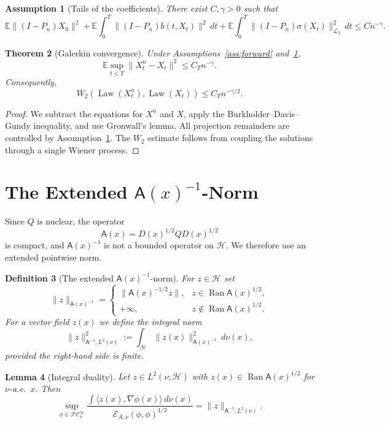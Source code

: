 \documentclass{article}
\newtheorem{theorem}{Theorem}[section]
\newtheorem{lemma}[theorem]{Lemma}
\newtheorem{assumption}[theorem]{Assumption}
\newtheorem{definition}[theorem]{Definition}
\newcommand{\Hh}{\mathcal H}
\newcommand{\LLtwo}{\mathcal L_2}
\newcommand{\E}{\mathbb E}
\newcommand{\Law}{\operatorname{Law}}
\newcommand{\Asf}{\mathsf A}
\newcommand{\Ran}{\operatorname{Ran}}
\newcommand{\FC}{\mathcal{FC}_b^\infty}
\begin{document}
\begin{assumption}[Tails of the coefficients]
\label{ass:tails}
There exist \(C,\gamma>0\) such that
\[
        \E\|(I-P_n)X_0\|^2+
        \E\int_0^T\|(I-P_n)b(t,X_t)\|^2\,dt+
        \E\int_0^T\|(I-P_n)\sigma(X_t)\|_{\LLtwo}^2\,dt
        \le Cn^{-\gamma}.
\]
\end{assumption}

\begin{theorem}[Galerkin convergence]
\label{thm:galerkin}
Under Assumptions~\ref{ass:forward} and~\ref{ass:tails},
\[
        \E\sup_{t\le T}\|X_t^n-X_t\|^2\le C_T n^{-\gamma}.
\]
Consequently,
\[
        W_2(\Law(X_t^n),\Law(X_t))\le C_T n^{-\gamma/2}.
\]
\end{theorem}

\begin{proof}
We subtract the equations for \(X^n\) and \(X\), apply the
Burkholder--Davis--Gundy inequality, and use Gronwall's lemma. All projection
remainders are controlled by Assumption~\ref{ass:tails}. The \(W_2\) estimate
follows from coupling the solutions through a single Wiener process.
\end{proof}

\section{The Extended \(\Asf(x)^{-1}\)-Norm}

Since \(Q\) is nuclear, the operator
\[
        \Asf(x)=D(x)^{1/2}QD(x)^{1/2}
\]
is compact, and \(\Asf(x)^{-1}\) is not a bounded operator on \(\Hh\). We
therefore use an extended pointwise norm.

\begin{definition}[The extended \(\Asf(x)^{-1}\)-norm]
For \(z\in\Hh\) set
\[
        \|z\|_{\Asf(x)^{-1}}=
        \begin{cases}
        \|\Asf(x)^{-1/2}z\|, & z\in\Ran \Asf(x)^{1/2},\\
        +\infty, & z\notin\Ran \Asf(x)^{1/2}.
        \end{cases}
\]
For a vector field \(z(x)\) we define the integral norm
\[
        \|z\|_{\Asf^{-1},L^2(\nu)}^2
        :=
        \int_{\Hh}\|z(x)\|_{\Asf(x)^{-1}}^2\,d\nu(x),
\]
provided the right-hand side is finite.
\end{definition}

\begin{lemma}[Integral duality]
\label{lem:dual}
Let \(z\in L^2(\nu;\Hh)\) with
\(z(x)\in\Ran \Asf(x)^{1/2}\) for \(\nu\)-a.e.\ \(x\). Then
\[
        \sup_{\phi\in\FC}
        \frac{\int\langle z(x),\nabla\phi(x)\rangle\,d\nu(x)}
        {\mathcal E_{A,\nu}(\phi,\phi)^{1/2}}
        =
        \|z\|_{\Asf^{-1},L^2(\nu)} .
\]
\end{lemma}
\end{document}
